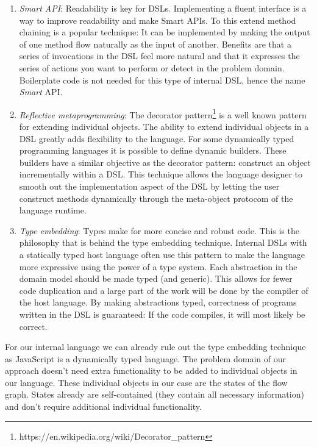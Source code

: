\begin{enumerate}
\item \textit{Smart API}: Readability is key for DSLs. Implementing a fluent interface is a way to improve readability and make Smart APIs. To this extend method chaining is a popular technique: It can be implemented by making the output of one method flow naturally as the input of another. Benefits are that a series of invocations in the DSL feel more natural and that it expresses the series of actions you want to perform or detect in the problem domain. Boilerplate code is not needed for this type of internal DSL, hence the name \textit{Smart} API.
\item \textit{Reflective metaprogramming}: The decorator pattern\footnote{https://en.wikipedia.org/wiki/Decorator\_pattern} is a well known pattern for extending individual objects. The ability to extend individual objects in a DSL greatly adds flexibility to the language. For some dynamically typed programming languages it is possible to define dynamic builders. These builders have a similar objective as the decorator pattern: construct an object incrementally within a DSL. This technique allows the language designer to smooth out the implementation aspect of the DSL by letting the user construct methods dynamically through the meta-object protocom of the language runtime.
\item \textit{Type embedding}: Types make for more concise and robust code. This is the philosophy that is behind the type embedding technique. Internal DSLs with a statically typed host language often use this pattern to make the language more expressive using the power of a type system. Each abstraction in the domain model should be made typed (and generic). This allows for fewer code duplication and a large part of the work will be done by the compiler of the host language. By making abstractions typed, correctness of programs written in the DSL is guaranteed: If the code compiles, it will most likely be correct.
\end{enumerate}

For our internal language we can already rule out the type embedding technique as JavaScript is a dynamically typed language. The problem domain of our approach doesn't need extra functionality to be added to individual objects in our language. These individual objects in our case are the states of the flow graph. States already are self-contained (they contain all necessary information) and don't require additional individual functionality. 

